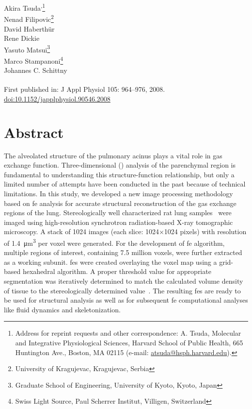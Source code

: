 \label{ch:Tsuda2008}

Akira Tsuda\textsuperscript{,}\footnote{Address for reprint requests and other correspondence: A. Tsuda, Molecular and Integrative Physiological Sciences, Harvard School of Public Health, 665 Huntington Ave., Boston, MA 02115 (e-mail: \href{mailto:atsuda@hsph.harvard.edu}{atsuda@hsph.harvard.edu}).}\\%
Nenad Filipovic\footnote{University of Kragujevac, Kragujevac, Serbia}\\%
David Haberthür\\%
Rene Dickie\\%
Yasuto Matsui\footnote{Graduate School of Engineering, University of Kyoto, Kyoto, Japan}\\%
Marco Stampanoni\footnote{Swiss Light Source, Paul Scherrer Institut, Villigen, Switzerland}\\%
Johannes C. Schittny\\\\
First published in: J Appl Physiol 105: 964–976, 2008.\\
\href{http://dx.doi.org/doi:10.1152/japplphysiol.90546.2008}{doi:10.1152/japplphysiol.90546.2008}
 
\section{Abstract}
The alveolated structure of the pulmonary acinus plays a vital role in gas exchange function. Three-dimensional (\threed) analysis of the parenchymal region is fundamental to understanding this structure-function relationship, but only a limited number of attempts have been conducted in the past because of technical limitations. In this study, we developed a new image processing methodology based on \ac{fe} analysis for accurate \threed structural reconstruction of the gas exchange regions of the lung. Stereologically well characterized rat lung samples~\cite{Tschanz2003} were imaged using high-resolution synchrotron radiation-based X-ray tomographic microscopy. A stack of 1024 images (each slice: 1024$\times$1024 pixels) with resolution of \SI{1.4}{\micro\meter\cubed} per voxel were generated. For the development of \ac{fe} algorithm, multiple regions of interest, containing 7.5 million voxels, were further extracted as a working subunit. \threed \ac{fe}s were created overlaying the voxel map using a grid-based hexahedral algorithm. A proper threshold value for appropriate segmentation was iteratively determined to match the calculated volume density of tissue to the stereologically determined value~\cite{Tschanz2003}. The resulting \threed \ac{fe}s are ready to be used for \threed structural analysis as well as for subsequent \ac{fe} computational analyses like fluid dynamics and skeletonization.

